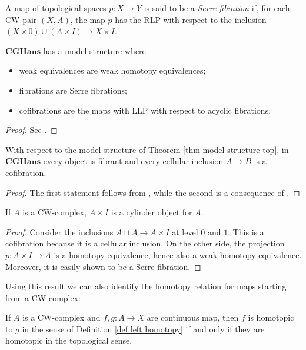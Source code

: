 \begin{refsection}
\begin{defin}
A map of topological spaces $p \colon X \to Y$ is said to be a \emph{Serre fibration} if, for each CW-pair $(X,A)$, the map $p$ has the RLP with respect to the inclusion $(X \times 0) \cup (A \times I) \to X \times I$.
\end{defin}

\begin{thm} \label{thm model structure top}
$\mathbf{CGHaus}$ has a model structure where
\begin{itemize}
\item weak equivalences are weak homotopy equivalences;
\item fibrations are Serre fibrations;
\item cofibrations are the maps with LLP with respect to acyclic fibrations.
\end{itemize}
\end{thm}

\begin{proof}
See \cite[Proposition 8.3]{dwsp}.
\end{proof}

\begin{prop}
With respect to the model structure of Theorem \ref{thm model structure top}, in $\mathbf{CGHaus}$ every object is fibrant and every cellular inclusion $A \to B$ is a cofibration.
\end{prop}

\begin{proof}
The first statement follows from \cite[Proposition 0.16]{hatcher}, while the second is a consequence of  \cite[Proposition 8.6]{dwsp}.
\end{proof}

\begin{prop}
If $A$ is a CW-complex, $A \times I$ is a cylinder object for $A$.
\end{prop}

\begin{proof}
Consider the inclusions $A \sqcup A \to A \times I$ at level $0$ and $1$. This is a cofibration because it is a cellular inclusion. On the other side, the projection $p \colon A \times I \to A$ is a homotopy equivalence, hence also a weak homotopy equivalence. Moreover, it is easily shown to be a Serre fibration.
\end{proof}

Using this result we can also identify the homotopy relation for maps starting from a CW-complex:

\begin{cor}
If $A$ is a CW-complex and $f,g \colon A \to X$ are continuous map, then $f$ is homotopic to $g$ in the sense of Definition \ref{def left homotopy} if and only if they are homotopic in the topological sense.
\end{cor}


\end{refsection}
